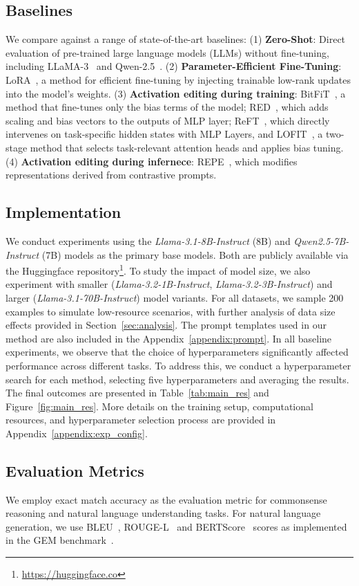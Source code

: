 \subsection{Baselines}
We compare \jola{} against a range of state-of-the-art baselines:
(1) \textbf{Zero-Shot}: Direct evaluation of pre-trained large language models (LLMs) without fine-tuning, including LLaMA-3~\cite{dubey2024llama} and Qwen-2.5~\cite{yang2024qwen2}.
(2) \textbf{Parameter-Efficient Fine-Tuning}: LoRA~\cite{hu2021lora}, a method for efficient fine-tuning by injecting trainable low-rank updates into the model's weights.
(3) \textbf{Activation editing during training}: BitFiT~\cite{ben-zaken-etal-2022-bitfit}, a method that fine-tunes only the bias terms of the model; RED~\cite{wu-etal-2024-advancing}, which adds scaling and bias vectors to the outputs of MLP layer; ReFT~\cite{wu2024reft}, which directly intervenes on task-specific hidden states with MLP Layers, and LOFIT~\cite{yin2024lofit}, a two-stage method that selects task-relevant attention heads and applies bias tuning.
(4) \textbf{Activation editing during infernece}: 
REPE~\cite{zou2023representation}, which modifies representations derived from contrastive prompts.

\subsection{Implementation}
We conduct experiments using the \textit{Llama-3.1-8B-Instruct} (8B) and \textit{Qwen2.5-7B-Instruct} (7B) models as the primary base models.
Both are publicly available via the Huggingface repository\footnote{\url{https://huggingface.co}}. 
To study the impact of model size, we also experiment with smaller (\textit{Llama-3.2-1B-Instruct}, \textit{Llama-3.2-3B-Instruct}) and larger (\textit{Llama-3.1-70B-Instruct}) model variants.
For all datasets, we sample 200 examples to simulate low-resource scenarios, with further analysis of data size effects provided in Section~\ref{sec:analysis}. 
The prompt templates used in our method are also included in the Appendix~\ref{appendix:prompt}.
In all baseline experiments, we observe that the choice of hyperparameters significantly affected performance across different tasks.
To address this, we conduct a hyperparameter search for each method, selecting five hyperparameters and averaging the results.
The final outcomes are presented in Table~\ref{tab:main_res} and Figure~\ref{fig:main_res}.
More details on the training setup, computational resources, and hyperparameter selection process are provided in Appendix~\ref{appendix:exp_config}.

\subsection{Evaluation Metrics}
We employ exact match accuracy as the evaluation metric for commonsense reasoning and natural language understanding tasks. 
For natural language generation, we use BLEU~\cite{papineni-etal-2002-bleu}, ROUGE-L~\cite{lin-2004-rouge} and BERTScore~\cite{zhang2019bertscore} scores as implemented in the GEM benchmark~\cite{gehrmann-etal-2022-gemv2}.